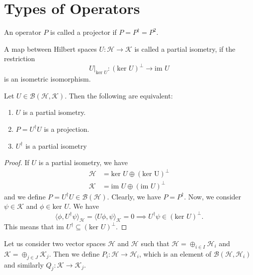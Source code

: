 \documentclass[twoside,symmetric, openany, 12pt]{./tuftebook}
\theoremstyle{definition}
\theoremstyle{definition}
\theoremstyle{definition}
\newenvironment{parts}{\begin{enumerate}[label=(\alph*)]}{\end{enumerate}}
\begin{document}
\section{Types of Operators}
\begin{Definition}[Projector]
	An operator $P$ is called a projector if $P=P^\dagger = P^2$.
\end{Definition}
\begin{Definition}
	A map between Hilbert spaces $U:\mathcal{H}\to \mathcal{K}$ is called a partial isometry, if the restriction
	\[
	U|_{\text{ker }U}:(\text{ker }U)^\perp \to \text{im }U
	\]
	is an isometric isomorphism.
\end{Definition}
\begin{Theorem}
	Let $U\in \mathcal{B}(\mathcal{H},\mathcal{K})$. Then the following are equivalent:
	\begin{parts}
		\item $U$ is a partial isometry.
		\item $P=U^\dagger U$ is a projection.
		\item $U^\dagger$ is a partial isometry
	\end{parts}
\end{Theorem}
\begin{proof}
	If $U$ is a partial isometry, we have
	\begin{align*}
		\mathcal{H}&= \text{ker }U\oplus(\text{ker U})^\perp\\
		\mathcal{K}&= \text{im }U\oplus (\text{im }U)^\perp
	\end{align*}
	and we define $P=U^\dagger U\in \mathcal{B}(\mathcal{H})$. Clearly, we have $P=P^\dagger$. Now, we consider $\psi\in \mathcal{K}$ and $\phi\in \text{ker }U$. We have
	\[
	\langle \phi, U^\dagger\psi\rangle_\mathcal{H}= \langle U\phi, \psi\rangle_\mathcal{K}=0\implies U^\dagger \psi \in (\text{ker }U)^\perp
	.\] 
	This means that $\text{im }U^\dagger\subseteq (\text{ker }U)^\perp$.	
\end{proof}
Let us consider two vector spaces $\mathcal{H}$ and $\mathcal{H}$ such that $\mathcal{H}=\oplus_{i\in I} \mathcal{H}_i$ and $\mathcal{K}=\oplus_{j\in J}\mathcal{K}_j$. Then we define $P_i: \mathcal{H}\to \mathcal{H}_i$, which is an element of $\mathcal{B}(\mathcal{H}, \mathcal{H}_i)$ and similarly $Q_j:\mathcal{K}\to \mathcal{K}_j$.
\end{document}
